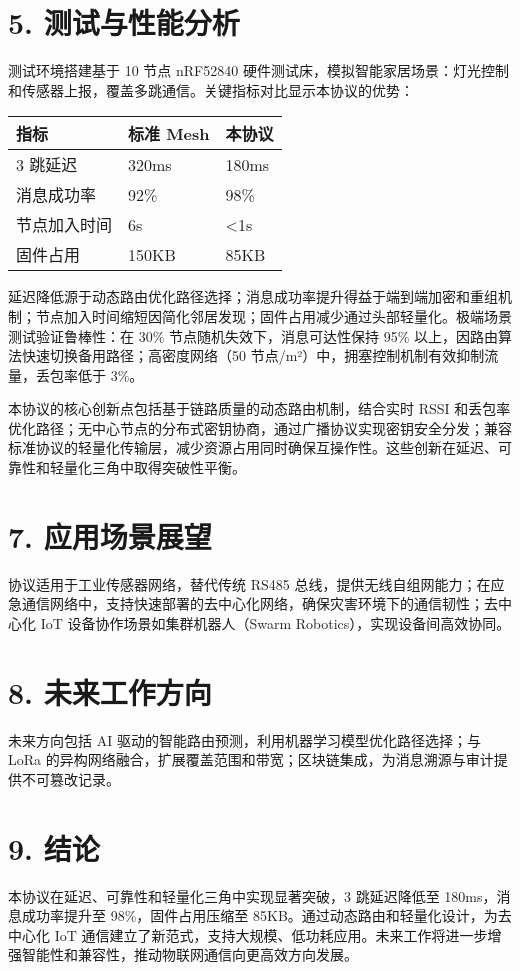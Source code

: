 \chapter{5. 测试与性能分析}
测试环境搭建基于 10 节点 nRF52840 硬件测试床，模拟智能家居场景：灯光控制和传感器上报，覆盖多跳通信。关键指标对比显示本协议的优势：\par
\begin{table}[H]
\centering
\begin{tabular}{|l|l|l|}
\hline
指标 & 标准 Mesh & 本协议 \\
\hline
3 跳延迟 & 320ms & 180ms \\
\hline
消息成功率 & 92\%{} & 98\%{} \\
\hline
节点加入时间 & 6s & <1s \\
\hline
固件占用 & 150KB & 85KB \\
\hline
\end{tabular}
\end{table}
延迟降低源于动态路由优化路径选择；消息成功率提升得益于端到端加密和重组机制；节点加入时间缩短因简化邻居发现；固件占用减少通过头部轻量化。极端场景测试验证鲁棒性：在 30\%{} 节点随机失效下，消息可达性保持 95\%{} 以上，因路由算法快速切换备用路径；高密度网络（50 节点/m²）中，拥塞控制机制有效抑制流量，丢包率低于 3\%{}。\par
本协议的核心创新点包括基于链路质量的动态路由机制，结合实时 RSSI 和丢包率优化路径；无中心节点的分布式密钥协商，通过广播协议实现密钥安全分发；兼容标准协议的轻量化传输层，减少资源占用同时确保互操作性。这些创新在延迟、可靠性和轻量化三角中取得突破性平衡。\par
\chapter{7. 应用场景展望}
协议适用于工业传感器网络，替代传统 RS485 总线，提供无线自组网能力；在应急通信网络中，支持快速部署的去中心化网络，确保灾害环境下的通信韧性；去中心化 IoT 设备协作场景如集群机器人（Swarm Robotics），实现设备间高效协同。\par
\chapter{8. 未来工作方向}
未来方向包括 AI 驱动的智能路由预测，利用机器学习模型优化路径选择；与 LoRa 的异构网络融合，扩展覆盖范围和带宽；区块链集成，为消息溯源与审计提供不可篡改记录。\par
\chapter{9. 结论}
本协议在延迟、可靠性和轻量化三角中实现显著突破，3 跳延迟降低至 180ms，消息成功率提升至 98\%{}，固件占用压缩至 85KB。通过动态路由和轻量化设计，为去中心化 IoT 通信建立了新范式，支持大规模、低功耗应用。未来工作将进一步增强智能性和兼容性，推动物联网通信向更高效方向发展。\par
